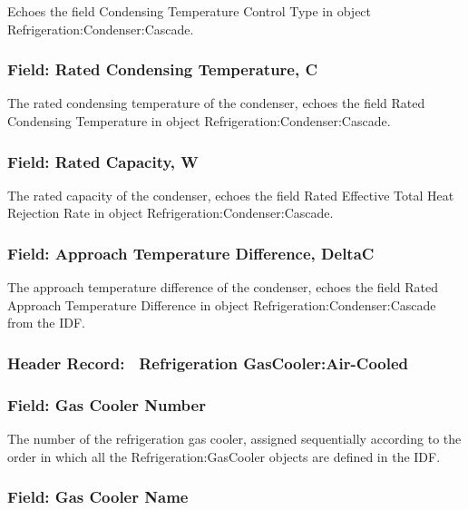 Echoes the field Condensing Temperature Control Type in object Refrigeration:Condenser:Cascade.

\subsubsection{Field: Rated Condensing Temperature, C}\label{field-rated-condensing-temperature-c-2}

The rated condensing temperature of the condenser, echoes the field Rated Condensing Temperature in object Refrigeration:Condenser:Cascade.

\subsubsection{Field: Rated Capacity, W}\label{field-rated-capacity-w-3}

The rated capacity of the condenser, echoes the field Rated Effective Total Heat Rejection Rate in object Refrigeration:Condenser:Cascade.

\subsubsection{Field: Approach Temperature Difference, DeltaC}\label{field-approach-temperature-difference-deltac}

The approach temperature difference of the condenser, echoes the field Rated Approach Temperature Difference in object Refrigeration:Condenser:Cascade from the IDF.

\subsubsection{Header Record:~ Refrigeration GasCooler:Air-Cooled}\label{header-record-refrigeration-gascoolerair-cooled}

\subsubsection{Field: Gas Cooler Number}\label{field-gas-cooler-number}

The number of the refrigeration gas cooler, assigned sequentially according to the order in which all the Refrigeration:GasCooler objects are defined in the IDF.

\subsubsection{Field: Gas Cooler Name}\label{field-gas-cooler-name}

